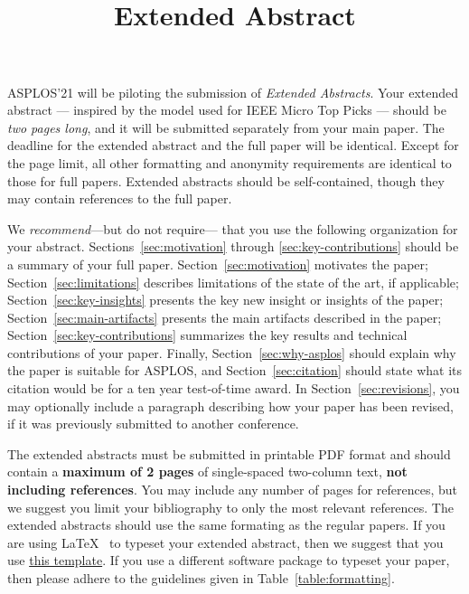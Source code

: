 



\title{\TITLE \\ \textbf{Extended Abstract}}

\date{}
\maketitle

\thispagestyle{empty}

ASPLOS'21 will be piloting the submission of {\it Extended
Abstracts}. Your extended abstract — inspired by the model used for
IEEE Micro Top
Picks — should be {\it two pages long}, and it will be submitted separately
from your main paper. The deadline for the extended abstract and the
full paper will be identical. Except for the page limit, all other
formatting and anonymity requirements are identical to those for full
papers. Extended abstracts should be self-contained, though they may
contain references to the full paper.

We \emph{recommend}---but do not require--- that you use
the following organization for your abstract. 
Sections~\ref{sec:motivation} through \ref{sec:key-contributions}
should be a summary of your full paper. Section~\ref{sec:motivation}
motivates the paper; Section~\ref{sec:limitations} describes
limitations of the state of the art, if applicable;
Section~\ref{sec:key-insights} presents the key new insight or
insights of the paper; 
Section~\ref{sec:main-artifacts} presents the main artifacts described
in the paper;  Section~\ref{sec:key-contributions} summarizes the key
results and technical contributions of your paper. Finally,
Section~\ref{sec:why-asplos} should explain why the paper is suitable
for ASPLOS, and Section~\ref{sec:citation} should state what its
citation would be for a ten year test-of-time award. In
Section~\ref{sec:revisions}, you may optionally include a paragraph
describing how your paper has been revised, if it was previously
submitted to another conference.

The extended abstracts must be submitted in printable PDF format and should contain a
{\bf maximum of 2 pages} of single-spaced two-column text, {\bf not
  including references}.  You may include any number of pages for
references, but we suggest you limit your bibliography to
only the most relevant references. The extended
abstracts should use the same formating as the regular papers. If you are using
\LaTeX~\cite{lamport94} to typeset your extended abstract, then we suggest that
you use \href{https://asplos-conference.org/wp-content/uploads/2020/06/asplos21-templates.zip}{this template}.
If you use a different
software package to typeset your paper, then please adhere to the
guidelines given in Table~\ref{table:formatting}.

